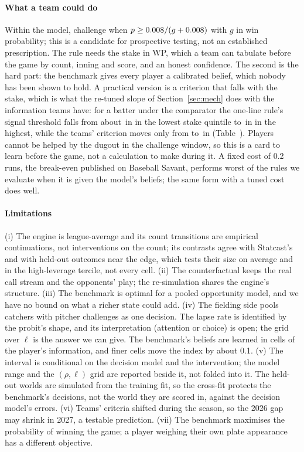 \documentclass[aoas]{imsart}
\theoremstyle{plain}
\theoremstyle{definition}
\begin{document}
\paragraph{What a team could do} Within the model, challenge when $p\ge0.008/(g+0.008)$ with $g$ in win
probability; this is a candidate for prospective testing, not an established prescription. The
rule needs the stake in WP, which a team can tabulate before the game by count, inning and score, and an honest
confidence. The second is the hard part: the benchmark gives every player a calibrated belief, which nobody has been
shown to hold. A practical version is a criterion that falls with the stake, which is what the re-tuned slope of
Section~\ref{sec:mech} does with the information teams have: for a batter under the comparator the one-line rule's
signal threshold falls from about \SRuleLowBatter\,in in the lowest stake quintile to \SRuleHighBatter\,in in the
highest, while the teams' criterion moves only from \KappaLowBatter{} to \KappaHighBatter\,in
(Table~). Players cannot be helped by the dugout in the challenge window, so
this is a card to learn before the game, not a calculation to make during it. A fixed cost of 0.2 runs, the break-even published on Baseball Savant, performs worst of the rules we evaluate when
it is given the model's beliefs; the same form with a tuned cost does well.

\paragraph{Limitations} (i) The engine is league-average and its count transitions are empirical continuations, not
interventions on the count; its contrasts agree with Statcast's and with held-out outcomes near the edge, which tests
their size on average and in the high-leverage tercile, not every cell. (ii) The counterfactual keeps the real call
stream and the opponents' play; the re-simulation shares the engine's structure. (iii) The benchmark is optimal for a
pooled opportunity model, and we have no bound on what a richer state could add. (iv) The fielding side pools catchers with \NChPitcher{} pitcher challenges as one decision. The lapse rate is identified by the probit's shape, and its interpretation (attention or choice) is open; the grid over $\ell$ is the answer we can give.
The benchmark's beliefs are learned in cells of the player's information, and finer cells move the index by about
0.1. (v) The interval is conditional on the decision model and the
intervention; the model range and the $(\rho,\ell)$ grid are reported beside it, not folded into it. The held-out worlds
are simulated from the training fit, so the cross-fit protects the benchmark's decisions, not the world they are scored
in, against the decision model's errors. (vi) Teams'
criteria shifted during the season, so the 2026 gap may shrink in 2027, a testable prediction. (vii) The benchmark
maximises the probability of winning the game; a player weighing their own plate appearance has a different objective.
\end{document}
